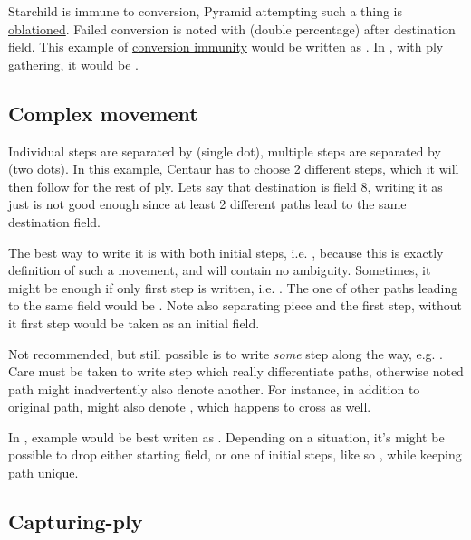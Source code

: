 Starchild is immune to conversion, Pyramid attempting such a thing is
\hyperref[sec:Terms/Oblation]{oblationed}. Failed conversion is noted with \alg{\%\%}
(double percentage) after destination field. This example of
\hyperref[fig:scn_o_17_starchild_conversion_immunity_init]{conversion immunity} would be
written as . In , with ply gathering, it would be
\alg{[Bs16-l23]\~{}[Al23-h23\%\%]}.

\subsection*{Complex movement}
\label{sec:Appendix/Notation/Complex movement}

Individual steps are separated by  (single dot), multiple steps are separated by
 (two dots). In this example,
\hyperref[fig:scn_hd_05_centaur_multi_step]{Centaur has to choose 2 different steps},
which it will then follow for the rest of ply. Lets say that destination is field 8,
writing it as just  is not good enough since at least 2 different paths lead
to the same destination field.

The best way to write it is with both initial steps, i.e. , because
this is exactly definition of such a movement, and will contain no ambiguity. Sometimes,
it might be enough if only first step is written, i.e. . The one of other
paths leading to the same  field would be . Note also 
separating piece and the first step, without it first step would be taken as an initial
field.

Not recommended, but still possible is to write \emph{some} step along the way, e.g.
. Care must be taken to write step which really differentiate paths,
otherwise noted path might inadvertently also denote another. For instance, in addition
to original path,  might also denote , which happens
to cross  as well.

In , example would be best writen as . Depending on a
situation, it's might be possible to drop either starting field, or one of initial steps,
like so , while keeping path unique.

\subsection*{Capturing-ply}
\label{sec:Appendix/Notation/Capturing-ply}

